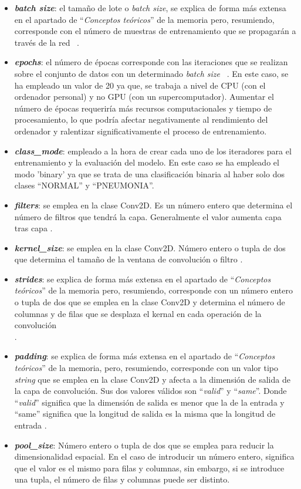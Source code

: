 \begin{itemize}
    \item \textbf{\textit{batch size}}: el tamaño de lote o \textit{batch size}, se explica de forma más extensa en el apartado de ``\textit{Conceptos teóricos}'' de la memoria pero, resumiendo, corresponde con el número de muestras de entrenamiento que se propagarán a través de la red ~\cite{stackbatch24}.
    \item \textbf{\textit{epochs}}: el número de épocas corresponde con las iteraciones que se realizan sobre el conjunto de datos con un determinado \textit{batch size} ~\cite{diego23}. En este caso, se ha empleado un valor de 20 ya que, se trabaja a nivel de CPU (con el ordenador personal) y no GPU (con un supercomputador). Aumentar el número de épocas requeriría más recursos computacionales y tiempo de procesamiento, lo que podría afectar negativamente al rendimiento del ordenador y ralentizar significativamente el proceso de entrenamiento.
    \item \textbf{\textit{class\_mode}}: empleado a la hora de crear cada uno de los iteradores para el entrenamiento y la evaluación del modelo. En este caso se ha empleado el modo 'binary' ya que se trata de una clasificación binaria al haber solo dos clases ``NORMAL'' y ``PNEUMONIA''.
    \item \textbf{\textit{filters}}: se emplea en la clase Conv2D. Es un número entero que determina el número de filtros que tendrá la capa. Generalmente el valor aumenta capa tras capa \cite{kerasconv2d24, diego23}.
    \item \textbf{\textit{kernel\_size}}: se emplea en la clase Conv2D. Número entero o tupla de dos que determina el tamaño de la ventana de convolución o filtro \cite{kerasconv2d24}.
    \item \textbf{\textit{strides}}: se explica de forma más extensa en el apartado de ``\textit{Conceptos teóricos}'' de la memoria pero, resumiendo, corresponde con un número entero o tupla de dos que se emplea en la clase Conv2D y determina el número de columnas y de filas que se desplaza el kernal en cada operación de la convolución\\ \cite{kerasconv2d24, diego23}.
    \item \textbf{\textit{padding}}: se explica de forma más extensa en el apartado de ``\textit{Conceptos teóricos}'' de la memoria, pero, resumiendo, corresponde con un valor tipo \textit{string} que se emplea en la clase Conv2D y afecta a la dimensión de salida de la capa de convolución. Sus dos valores válidos son ``\textit{valid}'' y ``\textit{same}''. Donde ``\textit{valid}'' significa que la dimensión de salida es menor que la de la entrada y ``same'' significa que la longitud de salida es la misma que la longitud de entrada \cite{stackoverflowpadding24}.
    \item \textbf{\textit{pool\_size}}:  Número entero o tupla de dos que se emplea para reducir la dimensionalidad espacial.  En el caso de introducir un número entero, significa que el valor es el mismo para filas y columnas, sin embargo, si se introduce una tupla, el número de filas y columnas puede ser distinto.
    

\end{itemize}
